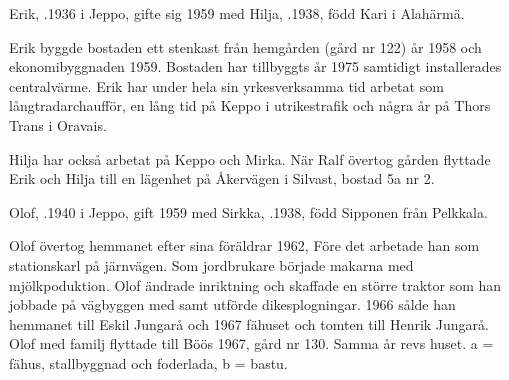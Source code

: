 Erik, .1936 i Jeppo, gifte sig 1959 med Hilja, .1938, född Kari i Alahärmä.
\begin{jhchildren}
  \item {}
  \item {}
\end{jhchildren}
Erik byggde bostaden ett stenkast från hemgården (gård nr 122) år	1958 och ekonomibyggnaden 1959. Bostaden har tillbyggts år 1975 samtidigt installerades centralvärme. Erik har under hela sin yrkesverksamma tid arbetat som långtradarchaufför, en lång tid på Keppo i utrikestrafik och några år på Thors Trans i  Oravais.

Hilja har också arbetat på Keppo och Mirka. När Ralf övertog gården flyttade Erik och Hilja till en lägenhet på Åkervägen i Silvast, bostad 5a nr 2.






Olof, .1940 i Jeppo, gift 1959 med Sirkka, .1938, född Sipponen från Pelkkala.
\begin{jhchildren}
  \item {}
  \item {}
  \item {}
\end{jhchildren}

Olof övertog hemmanet efter sina föräldrar 1962, Före det arbetade han som stationskarl på järnvägen. Som jordbrukare började makarna med mjölkpoduktion. Olof ändrade inriktning och skaffade en större traktor som  han jobbade på vägbyggen med samt utförde dikesplogningar. 1966 sålde han hemmanet till Eskil Jungarå och 1967 fähuset och tomten till Henrik Jungarå. Olof med familj flyttade till Böös 1967, gård nr 130. Samma år revs huset.  a = fähus, stallbyggnad och foderlada, b = bastu.


